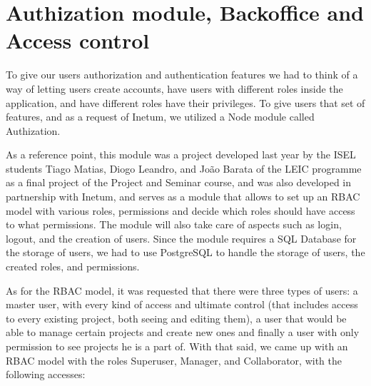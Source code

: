 \documentclass[a4paper,twoside,10pt]{report}
\begin{document}
\newpage
\section{Authization module, Backoffice and Access control}
 To give our users authorization and authentication features we had to think of a way of letting users create accounts, have users with different roles inside the application, and have different roles have their privileges. To give users that set of features, and as a request of Inetum, we utilized a Node module called Authization\cite{AUTHIZATION}. 

As a reference point, this module was a project developed last year by the ISEL students Tiago Matias, Diogo Leandro, and João Barata of the LEIC programme as a final project of the Project and Seminar course, and was also developed in partnership with Inetum, and serves as a module that allows to set up an RBAC model with various roles, permissions and decide which roles should have access to what permissions. The module will also take care of aspects such as login, logout, and the creation of users. Since the module requires a SQL Database for the storage of users, we had to use PostgreSQL\cite{POSTGRESQL} to handle the storage of users, the created roles, and permissions.

As for the RBAC model, it was requested that there were three types of users: a master user, with every kind of access and ultimate control (that includes access to every existing project, both seeing and editing them), a user that would be able to manage certain projects and create new ones and finally a user with only permission to see projects he is a part of.
With that said, we came up with an RBAC model with the roles Superuser, Manager, and Collaborator, with the following accesses:
 
\end{document}
